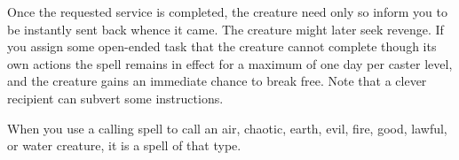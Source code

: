 Once the requested service is completed, the creature need only so inform you to 
be instantly sent back whence it came. The creature might later seek revenge. If 
you assign some open-ended task that the creature cannot complete though its own 
actions the spell remains in effect for a maximum of one day per caster level, 
and the creature gains an immediate chance to break free. Note that a clever recipient 
can subvert some instructions.

When you use a calling spell to call an air, chaotic, earth, evil, fire, good, 
lawful, or water creature, it is a spell of that type. 

